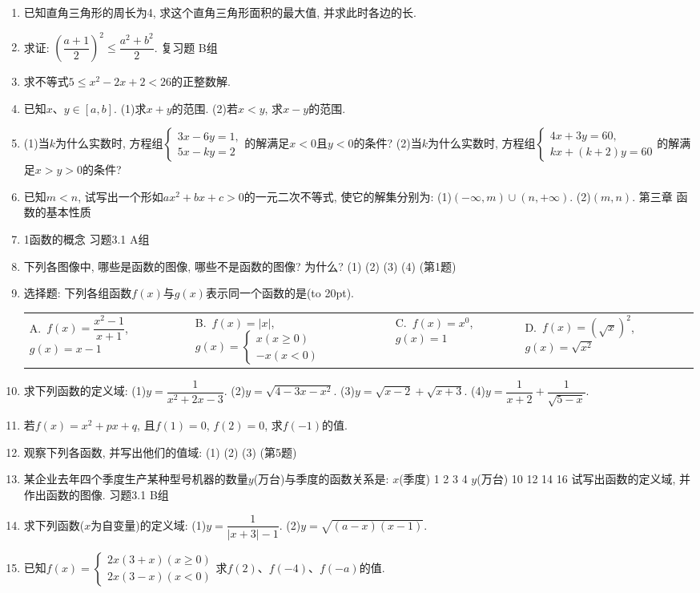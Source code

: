 \documentclass[10pt,a4paper]{article}
\newcommand{\bracket}[1]{(\hbox to #1pt{})}
\newcommand{\fourch}[4]{\par\begin{tabular}{p{.23\textwidth}p{.23\textwidth}p{.23\textwidth}p{.23\textwidth}}
A.~#1 &B.~#2& C.~#3& D.~#4
\end{tabular}}
\begin{document}
\begin{enumerate}[1.]
\item 已知直角三角形的周长为4, 求这个直角三角形面积的最大值, 并求此时各边的长.
\item 求证: $(\dfrac{a+1}2)^2\le \dfrac{a^2+b^2}2$.
复习题
B组
\item 求不等式$5\le x^2-2x+2<26$的正整数解.
\item 已知$x$、$y\in [a,b]$.
(1)求$x+y$的范围.
(2)若$x<y$, 求$x-y$的范围.
\item (1)当$k$为什么实数时, 方程组$\begin{cases} 3x-6y=1, \\ 5x-ky=2 \end{cases}$的解满足$x<0$且$y<0$的条件?
(2)当$k$为什么实数时, 方程组$\begin{cases} 4x+3y=60, \\ kx+(k+2)y=60 \end{cases}$的解满足$x>y>0$的条件?
\item 已知$m<n$, 试写出一个形如$ax^2+bx+c>0$的一元二次不等式, 使它的解集分别为:
(1)$(-\infty ,m)\cup (n,+\infty)$.					(2)$(m,n)$.
第三章  函数的基本性质
\item 1函数的概念
习题3.1  A组
\item 下列各图像中, 哪些是函数的图像, 哪些不是函数的图像? 为什么?
(1)			(2)				(3)			(4)
(第1题)
\item 选择题:
下列各组函数$f(x)$与$g(x)$表示同一个函数的是\bracket{20}.
\fourch{$f(x)=\dfrac{{x^2}-1}{x+1}$, $g(x)=x-1$}{$f(x)=|x|$, $g(x)=\begin{cases} x(x\ge 0) \\ -x(x<0) \end{cases}$}{$f(x)=x^0$, $g(x)=1$}{$f(x)=(\sqrt x)^2$, $g(x)=\sqrt {x^2}$}
\item 求下列函数的定义域:
(1)$y=\dfrac 1{x^2+2x-3}$.						(2)$y=\sqrt {4-3x-x^2}$.
(3)$y=\sqrt {x-2}+\sqrt {x+3}$.					(4)$y=\dfrac 1{x+2}+\dfrac 1{\sqrt {5-x}}$.
\item 若$f(x)=x^2+px+q$, 且$f(1)=0$, $f(2)=0$, 求$f(-1)$的值.
\item 观察下列各函数, 并写出他们的值域:
(1)					(2)					(3)
(第5题)
\item 某企业去年四个季度生产某种型号机器的数量$y$(万台)与季度的函数关系是:
$x$(季度)	1	2	3	4
$y$(万台)	10	12	14	16
试写出函数的定义域, 并作出函数的图像.
习题3.1  B组
\item 求下列函数($x$为自变量)的定义域:
(1)$y=\dfrac 1{|x+3|-1}$.						(2)$y=\sqrt {(a-x)(x-1)}$.
\item 已知$f(x)=\begin{cases} 2x(3+x)(x\ge 0) \\ 2x(3-x)(x<0) \end{cases}$求$f(2)$、$f(-4)$、$f(-a)$的值.

\end{enumerate}
\end{document}
